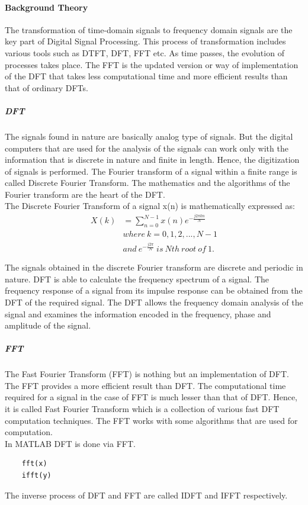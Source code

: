 \documentclass[12pt]{article}
\begin{document}
\paragraph{Background Theory\\}
The transformation of time-domain signals to frequency domain signals are the key part of Digital Signal Processing. This process of transformation includes various tools such as DTFT, DFT, FFT etc. As time passes, the evolution of processes takes place. The FFT is the updated version or way of implementation of the DFT that takes less computational time and more efficient results than that of ordinary DFTs.
\subparagraph{DFT\\}
The signals found in nature are basically analog type of signals. 
But the digital computers that are used for the analysis of the signals can work only with 
the information that is discrete in nature and finite in length. 
Hence, the digitization of signals is performed. 
The Fourier transform of a signal within a finite range is called Discrete Fourier Transform. 
The mathematics and the algorithms of the Fourier transform are the heart of the DFT.\\
The Discrete Fourier Transform of a signal x(n) is mathematically expressed as:\\
\begin{equation}
    \begin{aligned}
        X(k) &= \sum_{n=0}^{N-1} x(n)e^{-\frac{j2 \pi kn}{N}} \\
                &where \ k = 0, 1, 2, ..., N-1 \\
                &and \ e^{-\frac{j2 \pi }{N}} \ is \  Nth \ root \ of \ 1. 
    \end{aligned}
\end{equation}
    

The signals obtained in the discrete Fourier transform are discrete and periodic in nature. 
DFT is able to calculate the frequency spectrum of a signal. 
The frequency response of a signal from its impulse response can be obtained 
from the DFT of the required signal. 
The DFT allows the frequency domain analysis of the signal and 
examines the information encoded in the frequency, phase and amplitude of the signal.
\subparagraph{FFT\\}
The Fast Fourier Transform (FFT) is nothing but an implementation of DFT. 
The FFT provides a more efficient result than DFT. 
The computational time required for a signal in the case of FFT is much lesser than that of DFT. 
Hence, it is called Fast Fourier Transform which is a collection of various 
fast DFT computation techniques. 
The FFT works with some algorithms that are used for computation.\\
In MATLAB DFT is done via FFT.
\begin{verbatim}
    fft(x)
    ifft(y)
\end{verbatim}
The inverse process of DFT and FFT are called IDFT and IFFT respectively.
\pagebreak
\end{document}
